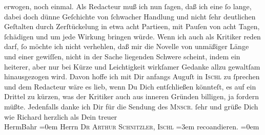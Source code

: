 \begin{ledgroupsized}[t]{13cm}
               erwogen, noch einmal. Als Redacteur muß ich nun ſagen, daß ich eine ſo lange, dabei
               doch dünne Geſchichte von ſchwacher Handlung und nicht ſehr deutlichen Geſtalten
               durch Zerſtückelung in etwa acht Partieen, mit Pauſen von acht Tagen, ſchädigen und
               um jede Wirkung bringen würde. Wenn ich auch als Kritiker reden darf, ſo möchte ich
               nicht verhehlen, daß mir die Novelle von unmäßiger Länge und {\pb}einer gewiſſen, nicht in der Sache liegenden
               Schwere scheint, indem ein heiterer, aber nur bei Kürze und Leichtigkeit wirkſamer
               Gedanke allzu gewaltſam hinausgezogen wird. Davon hoffe ich mit Dir anfangs Auguſt in
                  \textsc{Ischl} zu ſprechen und dem Redacteur wäre es lieb, wenn Du Dich entſchließen könnteſt,
               es auf ein Drittel zu kürzen, was der Kritiker auch aus inneren Gründen billigen, ja
               fordern müßte. Jedenfalls danke ich Dir für die Sendung des \textsc{Mnscr}. ſehr und grüße Dich wie Richard herzlich\pend
           \pstart
           als Dein treuer{\\[\baselineskip]}\spacefill\mbox{HermBahr}\pend
           \leftskip=0em{}\pstart
           \noindent{}Herrn \textsc{Dr Arthur Schnitzler, Ischl}\pend
           \leftskip=3em{}\pstart
           \noindent{}reco{\geminationm}andieren.\pend
           \leftskip=0em{}\pstart
           \textcolor{gray}{\textbf{\label{T_L00465_1v}\label{T_L00465_1h}}}\pend
                     \endnumbering{}\end{ledgroupsized}  \newcommand{\dateiname}{L00465}\newcommand{\titel}{Hermann Bahr an Arthur Schnitzler, 23. 7. 1895}\newcommand{\editorInnen}{ Kurt Ifkovits,  Martin Anton Müller}
            \footnotesize
\begin{ledgroupsized}[t]{11.5cm}
\end{ledgroupsized}
         
      